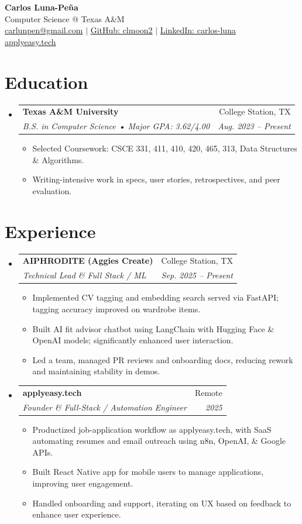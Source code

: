\documentclass[letterpaper,11pt]{article}
\makeatletter
\newcommand{\resumeItem}[1]{
\item\small{{#1 \vspace{-2pt}}}
}
\newcommand{\resumeSubheading}[4]{
\vspace{-2pt}\item
\begin{tabular*}{0.97\textwidth}[t]{l@{\extracolsep{\fill}}r}
\textbf{#1} & #2 \\
\textit{\small#3} & \textit{\small #4} \\
\end{tabular*}\vspace{-7pt}
}
\newcommand{\resumeSubHeadingListStart}{\begin{itemize}[leftmargin=0.15in, label={}]}
\newcommand{\resumeSubHeadingListEnd}{\end{itemize}}
\newcommand{\resumeItemListStart}{\begin{itemize}}
\newcommand{\resumeItemListEnd}{\end{itemize}\vspace{-5pt}}
\makeatother
\begin{document}
\begin{center}
    \textbf{\huge Carlos Luna-Peña} \\
    \vspace{2pt}
    {\large Computer Science @ Texas A\&M} \\
    \vspace{1pt}
    \href{mailto:carlunpen@gmail.com}{carlunpen@gmail.com} $|$ 
    \href{https://github.com/clmoon2}{GitHub: clmoon2} $|$ 
    \href{https://linkedin.com/in/carlos-luna}{LinkedIn: carlos-luna} \\
    \vspace{1pt}
    \href{https://applyeasy.tech}{applyeasy.tech}
\end{center}

\section{Education}
\resumeSubHeadingListStart
\resumeSubheading
{Texas A\&M University}{College Station, TX}
{B.S. in Computer Science • Major GPA: 3.62/4.00}{Aug. 2023 -- Present}
\resumeItemListStart
\resumeItem{Selected Coursework: CSCE 331, 411, 410, 420, 465, 313, Data Structures \& Algorithms.}
\resumeItem{Writing-intensive work in specs, user stories, retrospectives, and peer evaluation.}
\resumeItemListEnd
\resumeSubHeadingListEnd

\section{Experience}
\resumeSubHeadingListStart
\resumeSubheading
{AIPHRODITE (Aggies Create)}{College Station, TX}
{Technical Lead \& Full Stack / ML}{Sep. 2025 -- Present}
\resumeItemListStart
\resumeItem{Implemented CV tagging and embedding search served via FastAPI; tagging accuracy improved on wardrobe items.}
\resumeItem{Built AI fit advisor chatbot using LangChain with Hugging Face \& OpenAI models; significantly enhanced user interaction.}
\resumeItem{Led a team, managed PR reviews and onboarding docs, reducing rework and maintaining stability in demos.}
\resumeItemListEnd

\resumeSubheading
{applyeasy.tech}{Remote}
{Founder \& Full-Stack / Automation Engineer}{2025}
\resumeItemListStart
\resumeItem{Productized job-application workflow as applyeasy.tech, with SaaS automating resumes and email outreach using n8n, OpenAI, \& Google APIs.}
\resumeItem{Built React Native app for mobile users to manage applications, improving user engagement.}
\resumeItem{Handled onboarding and support, iterating on UX based on feedback to enhance user experience.}
\resumeItemListEnd
\resumeSubHeadingListEnd
\end{document}
